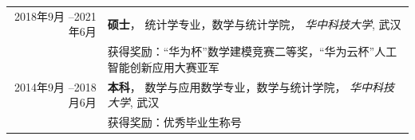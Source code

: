 %
%



\begin{tabular}{rl}	
	\textsc{2018年9月 --2021年6月}			  & \textbf{硕士}， 统计学专业，数学与统计学院， \emph{华中科技大学}, 武汉\\
	  	                            &  获得奖励：“华为杯”数学建模竞赛二等奖，“华为云杯”人工智能创新应用大赛亚军\\
	\textsc{2014年9月 --2018月6月} 	&  \textbf{本科}， 数学与应用数学专业，数学与统计学院， \emph{华中科技大学}, 武汉\\
									&  获得奖励：优秀毕业生称号\\
\end{tabular}
